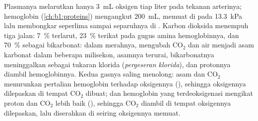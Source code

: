 \begin{proposition}\label{prop:b1:gas-exchange:transport}
Plasmanya melarutkan hanya \qty{3}{mL} oksigen tiap liter pada tekanan
arterinya; hemoglobin (\cref{ch:b1:proteins}) mengangkut \qty{200}{mL},
memuat di  pada \qty{13.3}{kPa} lalu membongkar seperlima
sampai separuhnya di . Karbon dioksida menempuh tiga jalan:
\qty{7}{\%} terlarut, \qty{23}{\%} terikat pada gugus amina
hemoglobinnya, dan \qty{70}{\%} sebagai bikarbonat: dalam  merahnya,
\emph{} mengubah $\mathrm{CO_2}$ dan air menjadi asam
karbonat dalam beberapa milisekon, asamnya terurai, bikarbonatnya
meninggalkan  sebagai tukaran klorida (\emph{pergeseran
klorida}), dan protonnya diambil hemoglobinnya. Kedua gasnya saling
menolong: asam dan $\mathrm{CO_2}$ menurunkan pertalian hemoglobin
terhadap oksigennya (\emph{}), sehingga oksigennya dilepaskan
di tempat $\mathrm{CO_2}$ dibuat; dan hemoglobin yang terdeoksigenasi
mengikat proton dan $\mathrm{CO_2}$ lebih baik (\emph{}),
sehingga $\mathrm{CO_2}$ diambil di tempat oksigennya dilepaskan, lalu
diserahkan di  seiring oksigennya memuat.
\end{proposition}

